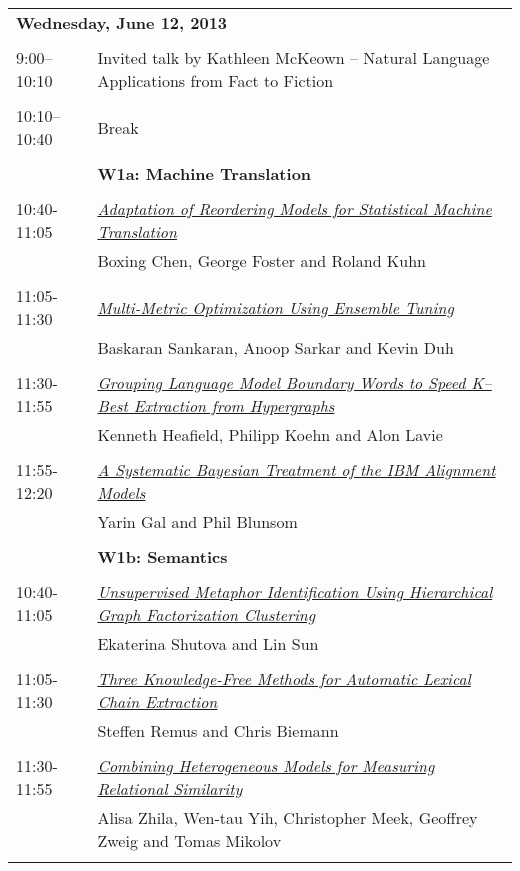 \newpage
\begin{tabular}{p{20mm}p{138mm}}
\\
\multicolumn{2}{l}{\bf Wednesday, June 12, 2013
} \\
\\
9:00--10:10 &  Invited talk by Kathleen McKeown -- Natural Language Applications from Fact to Fiction
 \\
\\
10:10--10:40 & Break
 \\
\\
 & {\bf W1a: Machine Translation
} \\
\\
10:40-11:05 & \hyperlink{page.938}{\em Adaptation of Reordering Models for Statistical Machine Translation}\\
         & Boxing Chen, George Foster and Roland Kuhn \\
\\

11:05-11:30 & \hyperlink{page.947}{\em Multi-Metric Optimization Using Ensemble Tuning}\\
         & Baskaran Sankaran, Anoop Sarkar and Kevin Duh \\
\\

11:30-11:55 & \hyperlink{page.958}{\em Grouping Language Model Boundary Words to Speed K--Best Extraction from Hypergraphs}\\
         & Kenneth Heafield, Philipp Koehn and Alon Lavie \\
\\

11:55-12:20 & \hyperlink{page.969}{\em A Systematic Bayesian Treatment of the IBM Alignment Models}\\
         & Yarin Gal and Phil Blunsom \\
\\

 & {\bf W1b: Semantics
} \\
\\
10:40-11:05 & \hyperlink{page.978}{\em Unsupervised Metaphor Identification Using Hierarchical Graph Factorization Clustering}\\
         & Ekaterina Shutova and Lin Sun \\
\\

11:05-11:30 & \hyperlink{page.989}{\em Three Knowledge-Free Methods for Automatic Lexical Chain Extraction}\\
         & Steffen Remus and Chris Biemann \\
\\

11:30-11:55 & \hyperlink{page.1000}{\em Combining Heterogeneous Models for Measuring Relational Similarity}\\
         & Alisa Zhila, Wen-tau Yih, Christopher Meek, Geoffrey Zweig and Tomas Mikolov \\
\\

\end{tabular}
